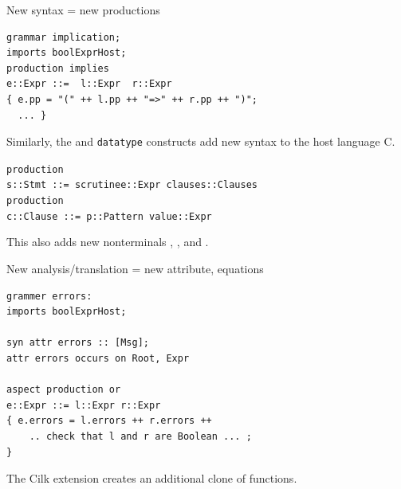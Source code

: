 \documentclass[notes,11pt,aspectratio=169]{beamer}
\begin{document}
\begin{frame}[fragile]{New syntax = new productions}
\begin{verbatim}
grammar implication;
imports boolExprHost;
production implies
e::Expr ::=  l::Expr  r::Expr
{ e.pp = "(" ++ l.pp ++ "=>" ++ r.pp ++ ")";
  ... }
\end{verbatim}
\pause

\bigskip
Similarly, the  and \texttt{datatype}
constructs add new syntax to the host language C.

\begin{tabbing}
\texttt{production } \\
\texttt{s::Stmt ::= scrutinee::Expr clauses::Clauses}\\
\texttt{production } \\
\texttt{c::Clause ::= p::Pattern  value::Expr}
\end{tabbing}

\bigskip
This also adds new nonterminals
\texttt{}, \texttt{}, and
\texttt{}.

\end{frame}


\begin{frame}[fragile]{New analysis/translation = new attribute, equations}

\begin{verbatim}
grammer errors:
imports boolExprHost;

syn attr errors :: [Msg];
attr errors occurs on Root, Expr

aspect production or
e::Expr ::= l::Expr r::Expr
{ e.errors = l.errors ++ r.errors ++
    .. check that l and r are Boolean ... ;
}
\end{verbatim}

\pause
\bigskip
The Cilk extension creates an additional clone of 
\texttt{} functions.
\end{frame}


\end{document}
